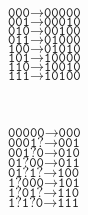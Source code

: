 \begin{center}
\begin{minipage}{0.16\thelinewidth}
$\texttt{000} \rightarrow \texttt{00000}$ \\
$\texttt{001} \rightarrow \texttt{00010}$ \\
$\texttt{010} \rightarrow \texttt{00100}$ \\
$\texttt{011} \rightarrow \texttt{01000}$ \\
$\texttt{100} \rightarrow \texttt{01010}$ \\
$\texttt{101} \rightarrow \texttt{10000}$ \\
$\texttt{110} \rightarrow \texttt{10010}$ \\
$\texttt{111} \rightarrow \texttt{10100}$ \\
\end{minipage}
~
\begin{minipage}{0.16\thelinewidth}
$\texttt{00000} \rightarrow \texttt{000}$ \\
$\texttt{0001?} \rightarrow \texttt{001}$ \\
$\texttt{001?0} \rightarrow \texttt{010}$ \\
$\texttt{01?00} \rightarrow \texttt{011}$ \\
$\texttt{01?1?} \rightarrow \texttt{100}$ \\
$\texttt{1?000} \rightarrow \texttt{101}$ \\
$\texttt{1?01?} \rightarrow \texttt{110}$ \\
$\texttt{1?1?0} \rightarrow \texttt{111}$ \\
\end{minipage}
\end{center}
